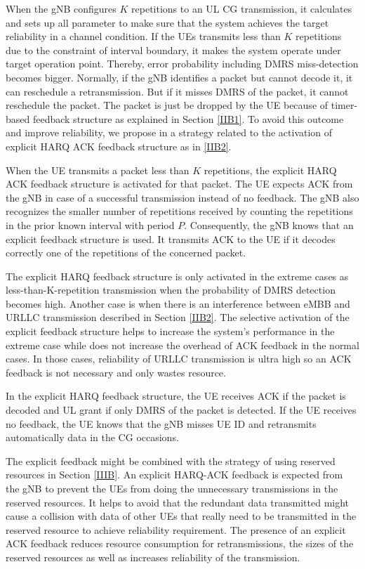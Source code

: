 \documentclass{ieeeaccess}
\begin{document}
When the gNB configures $K$ repetitions to an UL CG transmission, it calculates and sets up all parameter to make sure that the system achieves the target reliability in a channel condition. If the UEs transmits less than $K$ repetitions due to the constraint of interval boundary, it makes the system operate under target operation point. Thereby, error probability including DMRS miss-detection becomes bigger. Normally, if the gNB identifies a packet but cannot decode it, it can reschedule a retransmission. But if it misses DMRS of the packet, it cannot reschedule the packet. The packet is just be dropped by the UE because of timer-based feedback structure as explained in Section \ref{IIB1}. To avoid this outcome and improve reliability,  we propose in \cite{ad100} a strategy related to the activation of explicit HARQ ACK feedback structure as in \ref{IIB2}.

When the UE transmits a packet less than $K$ repetitions, the explicit HARQ ACK feedback structure is activated for that packet. The UE expects ACK from the gNB in case of a successful transmission instead of no feedback. The gNB also recognizes the smaller number of repetitions received by counting the repetitions in the prior known interval with period $P$. Consequently, the gNB knows that an explicit feedback structure is used. It transmits ACK to the UE if it decodes correctly one of the repetitions of the concerned packet.

The explicit HARQ feedback structure is only activated in the extreme cases as less-than-K-repetition transmission when the probability of DMRS detection becomes high. Another case is when there is an interference between eMBB and URLLC transmission described in Section \ref{IIB2}. The selective activation of the explicit feedback structure helps to increase the system's performance in the extreme case while does not increase the overhead of ACK feedback in the normal cases. In those cases, reliability of URLLC transmission is ultra high so an ACK feedback is not necessary and only wastes resource.

In the explicit HARQ feedback structure, the UE receives ACK if the packet is decoded and UL grant if only DMRS of the packet is detected. If the UE receives no feedback, the UE knows that the gNB misses UE ID and retransmits automatically data in the CG occasions.

The explicit feedback might be combined with the strategy of using reserved resources in Section \ref{IIIB}. An explicit HARQ-ACK feedback is expected from the gNB to prevent the UEs from doing the unnecessary transmissions in the reserved resources. It helps to avoid that the redundant data transmitted might cause a collision with data of other UEs that really need to be transmitted in the reserved resource to achieve reliability requirement. The presence of an explicit ACK feedback reduces resource consumption for retransmissions, the sizes of the reserved resources as well as increases reliability of the transmission. 
\end{document}
